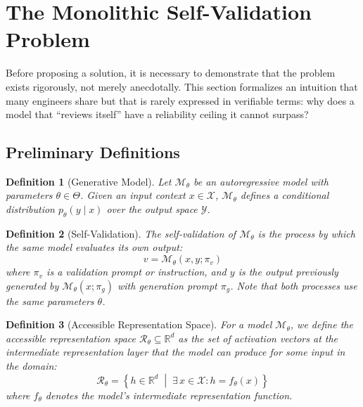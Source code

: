 \documentclass[11pt,a4paper]{article}
\newtheorem{definition}{Definition}[section]
\theoremstyle{remark}
\newcommand{\R}{\mathbb{R}}
\begin{document}
\section{The Monolithic Self-Validation Problem}
\label{sec:problem}

Before proposing a solution, it is necessary to demonstrate that the problem exists rigorously, not merely anecdotally. This section formalizes an intuition that many engineers share but that is rarely expressed in verifiable terms: why does a model that ``reviews itself'' have a reliability ceiling it cannot surpass?

\subsection{Preliminary Definitions}

\begin{definition}[Generative Model]
\label{def:model}
Let $\mathcal{M}_\theta$ be an autoregressive model with parameters $\theta \in \Theta$. Given an input context $x \in \mathcal{X}$, $\mathcal{M}_\theta$ defines a conditional distribution $p_\theta(y \mid x)$ over the output space $\mathcal{Y}$.
\end{definition}

\begin{definition}[Self-Validation]
\label{def:selfvalidation}
The self-validation of $\mathcal{M}_\theta$ is the process by which the same model evaluates its own output:
\begin{equation}
  v = \mathcal{M}_\theta(x, y; \pi_v)
\end{equation}
where $\pi_v$ is a validation prompt or instruction, and $y$ is the output previously generated by $\mathcal{M}_\theta(x; \pi_g)$ with generation prompt $\pi_g$. Note that both processes use the same parameters $\theta$.
\end{definition}

\begin{definition}[Accessible Representation Space]
\label{def:rep_space}
For a model $\mathcal{M}_\theta$, we define the \emph{accessible representation space} $\mathcal{R}_\theta \subseteq \R^d$ as the set of activation vectors at the intermediate representation layer that the model can produce for some input in the domain:
\begin{equation}
  \mathcal{R}_\theta = \left\{ h \in \R^d \;\middle|\; \exists\, x \in \mathcal{X} : h = f_\theta(x) \right\}
\end{equation}
where $f_\theta$ denotes the model's intermediate representation function.
\end{definition}
\end{document}

